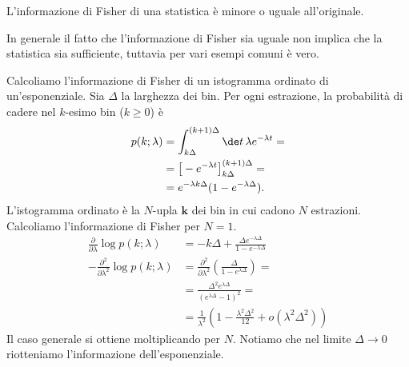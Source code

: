 \begin{fact}
	\label{th:fishstat}
	L'informazione di Fisher di una statistica è minore o uguale all'originale.
\end{fact}

\noindent In generale il fatto che l'informazione di Fisher sia uguale non implica che la statistica sia sufficiente, tuttavia per vari esempi comuni è vero.

\begin{example}
	Calcoliamo l'informazione di Fisher di un istogramma ordinato di un'esponenziale.
	Sia $\Delta$ la larghezza dei bin.
	Per ogni estrazione, la probabilità di cadere nel $k$-esimo bin ($k\ge 0$) è
	\begin{align*}
		p(k;\lambda)
		&= \int_{k\Delta}^{(k+1)\Delta}\de t\, \lambda e^{-\lambda t} = \\
		&= \big[-e^{-\lambda t}\big]_{k\Delta}^{(k+1)\Delta} = \\
		&= e^{-\lambda k\Delta}(1-e^{-\lambda\Delta}).
	\end{align*}
	L'istogramma ordinato è la $N$-upla $\mathbf k$ dei bin in cui cadono $N$ estrazioni.
	Calcoliamo l'informazione di Fisher per $N=1$.
	\begin{align*}
		\frac{\partial}{\partial\lambda} \log p(k;\lambda)
		&= -k\Delta + \frac{\Delta e^{-\lambda\Delta}}{1-e^{-\lambda\Delta}} \\
		-\frac{\partial^2}{\partial\lambda^2} \log p(k;\lambda)
		&= \frac{\partial^2}{\partial\lambda^2}
		\left( \frac{\Delta}{1-e^{\lambda\Delta}} \right) = \\
		&= \frac {\Delta^2 e^{\lambda\Delta}} {(e^{\lambda\Delta}-1)^2} = \\
		&= \frac1{\lambda^2} \left( 1 - \frac{\lambda^2\Delta^2}{12} + o(\lambda^2\Delta^2) \right)
	\end{align*}
	Il caso generale si ottiene moltiplicando per $N$.
	Notiamo che nel limite $\Delta\to0$ riotteniamo l'informazione dell'esponenziale.
\end{example}
